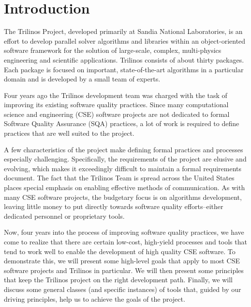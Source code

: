 \documentclass[12pt,relax]{article}
\begin{document}

\section{Introduction}
\label{Section:Introduction}


The Trilinos Project, developed primarily at Sandia National Laboratories, is
an effort to develop parallel solver algorithms and libraries within an
object-oriented software framework for the solution of large-scale, complex,
multi-physics engineering and scientific applications.  Trilinos consists of
about thirty packages.  Each package is focused on important, state-of-the-art
algorithms in a particular domain and is developed by a small team of experts.

Four years ago the Trilinos development team was charged with the task of
improving its existing software quality practices.  Since many computational
science and engineering (CSE) software projects are not dedicated to formal
Software Quality Assurance (SQA) practices, a lot of work is required to define
practices that are well suited to the project.

A few characteristics of the project make defining formal practices and
processes especially challenging.  Specifically, the requirements of the
project are elusive and evolving, which makes it exceedingly difficult to
maintain a formal requirements document.  The fact that the Trilinos Team is
spread across the United States places special emphasis on enabling effective
methods of communication.  As with many CSE software projects, the budgetary
focus is on algorithms development, leaving little money to put directly
towards software quality efforts--either dedicated personnel or proprietary
tools.

Now, four years into the process of improving software quality practices, we 
have come to realize that there are certain low-cost, high-yield processes and
tools that tend to work well to enable the development of high quality CSE
software.  To demonstrate this, we will present some high-level goals that 
apply to most CSE software projects and Trilinos in particular.  We will then
present some principles that keep the Trilinos project on the right development
path.  Finally, we will discuss some general classes (and specific instances)
of tools that, guided by our driving principles, help us to achieve the goals
of the project.
\end{document}
